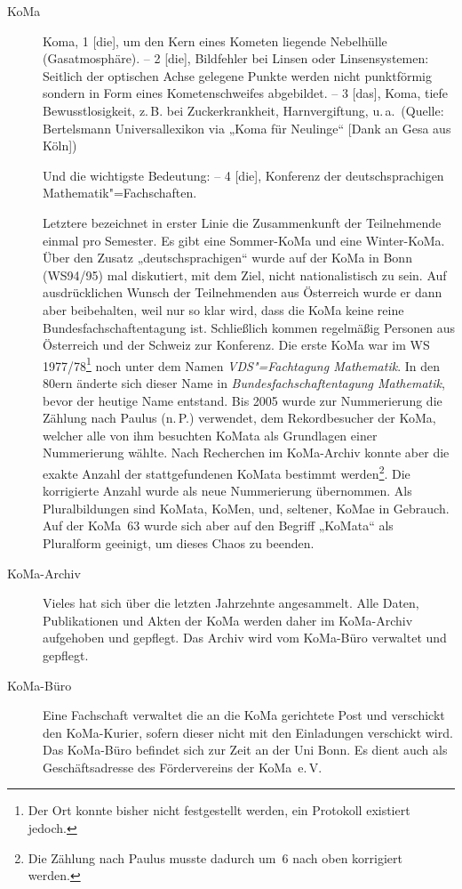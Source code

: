 \begin{description}
\item[KoMa]
    Koma, 1 [die], um den Kern eines Kometen liegende Nebelhülle (Gasatmosphäre). -- 2 [die], Bildfehler bei Linsen oder Linsensystemen: Seitlich der optischen Achse gelegene Punkte werden nicht punktförmig sondern in Form eines Kometenschweifes abgebildet. -- 3 [das], Koma, tiefe Bewusstlosigkeit, z.\,B. bei Zuckerkrankheit, Harnvergiftung, u.\,a.\ (Quelle: Bertelsmann Universallexikon via „Koma für Neulinge“ [Dank an Gesa aus Köln])

	Und die wichtigste Bedeutung: -- 4 [die], Konferenz der deutschsprachigen Mathematik"=Fachschaften.

	Letztere bezeichnet in erster Linie die Zusammenkunft der Teilnehmende einmal pro Semester. Es gibt eine Sommer-KoMa und eine Winter-KoMa. Über den Zusatz „deutschsprachigen“ wurde auf der KoMa in Bonn (WS94/95) mal diskutiert, mit dem Ziel, nicht nationalistisch zu sein. Auf ausdrücklichen Wunsch der Teilnehmenden aus Österreich wurde er dann aber beibehalten, weil nur so klar wird, dass die KoMa keine reine Bundesfachschaftentagung ist. Schließlich kommen regelmäßig Personen aus Österreich und der Schweiz zur Konferenz. Die erste KoMa war im WS 1977/78\footnote{Der Ort konnte bisher nicht festgestellt werden, ein Protokoll existiert jedoch.} noch unter dem Namen \emph{VDS"=Fachtagung Mathematik}. In den 80ern änderte sich dieser Name in \emph{Bundesfachschaftentagung Mathematik}, bevor der heutige Name entstand.  Bis 2005 wurde zur Nummerierung die Zählung nach Paulus (n.\,P.) verwendet, dem Rekordbesucher der KoMa, welcher alle von ihm besuchten KoMata als Grundlagen einer Nummerierung wählte. Nach Recherchen im KoMa-Archiv konnte aber die exakte Anzahl der stattgefundenen KoMata bestimmt werden\footnote{Die Zählung nach Paulus musste dadurch um~6 nach oben korrigiert werden.}. Die korrigierte Anzahl wurde als neue Nummerierung übernommen. Als Pluralbildungen sind KoMata, KoMen, und, seltener, KoMae in Gebrauch. Auf der KoMa~63 wurde sich aber auf den Begriff „KoMata“ als Pluralform geeinigt, um dieses Chaos zu beenden.

\item[KoMa-Archiv]
    Vieles hat sich über die letzten Jahrzehnte angesammelt. Alle Daten, Publikationen und Akten der KoMa werden daher im KoMa-Archiv aufgehoben und gepflegt. Das Archiv wird vom KoMa-Büro verwaltet und gepflegt.

\item[KoMa-Büro]
    Eine Fachschaft verwaltet die an die KoMa gerichtete Post und verschickt den KoMa-Kurier, sofern dieser nicht mit den Einladungen verschickt wird. Das KoMa-Büro befindet sich zur Zeit an der Uni Bonn. Es dient auch als Geschäftsadresse des Fördervereins der KoMa~e.\,V.


\end{description}
